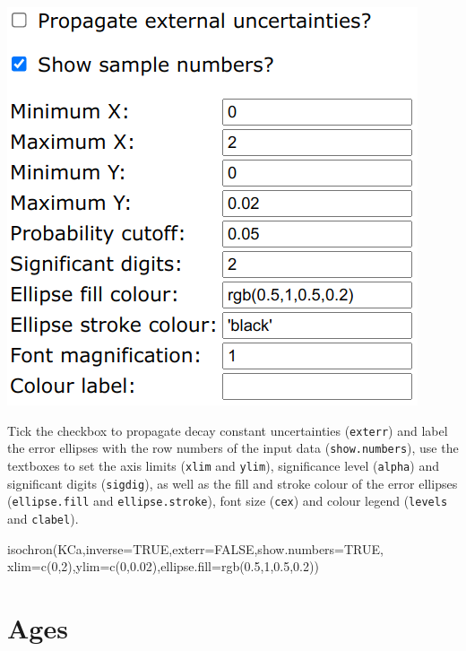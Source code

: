 \begin{refsection}
\begin{enumerate}
\noindent\begin{minipage}[t]{.45\linewidth}
\strut\vspace*{-\baselineskip}\newline
\includegraphics[width=\linewidth]{../figures/KCaIsochronOtherOptions.png}
\end{minipage}
\begin{minipage}[t]{.55\linewidth}
Tick the checkbox to propagate decay constant uncertainties
(\texttt{exterr}) and label the error ellipses with the row numbers of
the input data (\texttt{show.numbers}), use the textboxes to set the
axis limits (\texttt{xlim} and \texttt{ylim}), significance level
(\texttt{alpha}) and significant digits (\texttt{sigdig}), as well as
the fill and stroke colour of the error ellipses
(\texttt{ellipse.fill} and \texttt{ellipse.stroke}), font size
(\texttt{cex}) and colour legend (\texttt{levels} and
\texttt{clabel}).
\end{minipage}

\begin{script}
isochron(KCa,inverse=TRUE,exterr=FALSE,show.numbers=TRUE,
         xlim=c(0,2),ylim=c(0,0.02),ellipse.fill=rgb(0.5,1,0.5,0.2))
\end{script}
  
\end{enumerate}

\section{Ages}\label{sec:ArArKCaAges}


\end{refsection}
